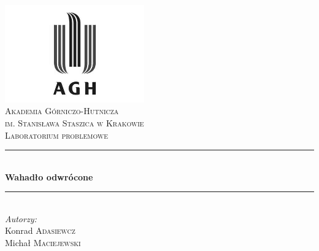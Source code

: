 \begin{titlepage}

\newcommand{\HRule}{\rule{\linewidth}{0.5mm}}

\center
 

\includegraphics[width=6cm]{../res/img/logo.png}\\[1cm]
 
 

\textsc{\LARGE Akademia Górniczo-Hutnicza \\[0.2cm]
im. Stanisława Staszica w Krakowie}\\[1.5cm]

\textsc{\Large Laboratorium problemowe}\\[0.5cm]


\HRule \\[0.5cm]
{ \huge \bfseries Wahadło odwrócone}\\[0.3cm]
\HRule \\[1.5cm]

\flushright
\Large \emph{Autorzy:}\\
Konrad \textsc{Adasiewcz}\\[0.1cm]  %
Michał \textsc{Maciejewski}\\[0.1cm]  %



\vfill %

\end{titlepage}